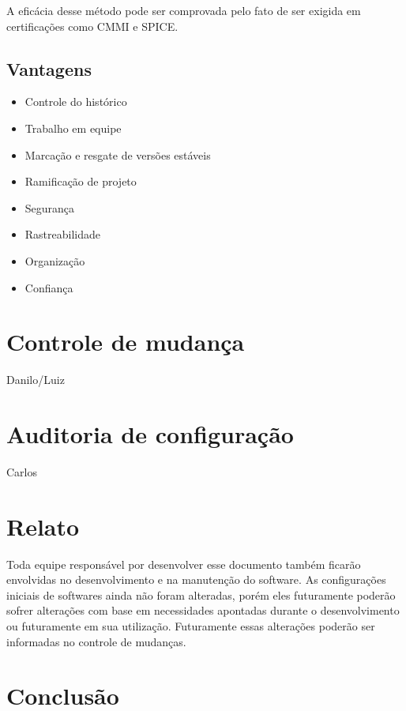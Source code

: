 \documentclass[12pt]{article}
\begin{document}
        A eficácia desse método pode ser comprovada pelo fato de ser exigida em certificações como CMMI e SPICE.
        
        \subsection{Vantagens}
            \begin{itemize}
                \item Controle do histórico
                \item Trabalho em equipe
                \item Marcação e resgate de versões estáveis
                \item Ramificação de projeto
                \item Segurança
                \item Rastreabilidade
                \item Organização
                \item Confiança
            \end{itemize}
        
    \section{Controle de mudança}
        Danilo/Luiz
    \section{Auditoria de configuração}
        Carlos
    \section{Relato}  
        Toda equipe responsável por desenvolver esse documento também ficarão envolvidas no desenvolvimento e na manutenção do software. As configurações iniciais de softwares ainda não foram alteradas, porém eles futuramente poderão sofrer alterações com base em necessidades apontadas durante o desenvolvimento ou futuramente em sua utilização. Futuramente essas alterações poderão ser informadas no controle de mudanças.
    
    \section{Conclusão}
    
\end{document}

